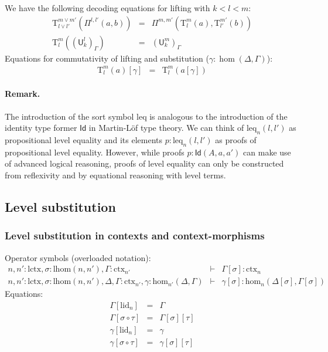 \documentclass[11pt,a4paper]{article}
\theoremstyle{definition}
\newcommand{\Id}{\mathsf{Id}}
\newcommand{\UU}{\mathsf{U}}
\def\lhom{\mathrm{lhom}}
\def\UU{\mathsf{U}}
\newcommand{\N}{\mathsf{N}}
\def\Hom{\mathrm{hom}}
\def\lctx{\mathrm{lctx}}
\def\leq{\mathrm{leq}}
\def\lid{\mathrm{lid}}
\newcommand{\ctx}{\mathrm{ctx}}
\newcommand{\Ta}{\mathrm{T}}
\begin{document}
We have the following decoding equations for lifting with $k < l < m$:
\begin{eqnarray*}
\Ta^{m \vee m'}_{l \vee l'}(\Pi^{l,l'}(a,b)) &=& \Pi^{m,m'}(\Ta^m_l(a),\Ta^{m'}_{l'}(b))\\
\Ta^m_l((\UU^l_k)_\Gamma) &=& (\UU^m_k)_\Gamma
\end{eqnarray*}
Equations for commutativity of lifting and substitution ($\gamma : \hom(\Delta,\Gamma)$):
\begin{eqnarray*}
\Ta^m_l(a) [ \gamma ] &=& \Ta^m_l(a[ \gamma ] )
\end{eqnarray*}

\paragraph{Remark.} The introduction of the sort symbol $\leq$ is analogous to the introduction of the identity type former $\Id$ in Martin-Löf type theory. We can think of $\leq_n(l,l')$ as propositional level equality and its elements $p : \leq_n(l,l')$ as proofs of propositional level equality. However, while proofs $p : \Id(A,a,a')$ can make use of advanced logical reasoning, proofs of level equality can only be constructed from reflexivity and by equational reasoning with level terms. 


\subsection{Level substitution}

\subsubsection{Level substitution in contexts and context-morphisms}

Operator symbols (overloaded notation):
\begin{eqnarray*}
n, n' : \lctx , \sigma : \lhom(n,n'), \Gamma : \ctx_{n'} &\vdash& 
\Gamma[\sigma] : \ctx_n\\
n, n' : \lctx , \sigma : \lhom(n,n'), \Delta,\Gamma : \ctx_{n'}, \gamma : \Hom_{n'}(\Delta,\Gamma) 
&\vdash& 
\gamma[\sigma] : \Hom_{n}(\Delta[\sigma],\Gamma[\sigma]) 
\end{eqnarray*}
Equations:
\begin{eqnarray*}
\Gamma[\lid_n] &=& \Gamma\\
\Gamma[\sigma \circ \tau] &=& \Gamma[\sigma][\tau]\\
\gamma[\lid_n] &=& \gamma\\
\gamma[\sigma \circ \tau] &=& \gamma[\sigma][\tau]
\end{eqnarray*}
\end{document}
